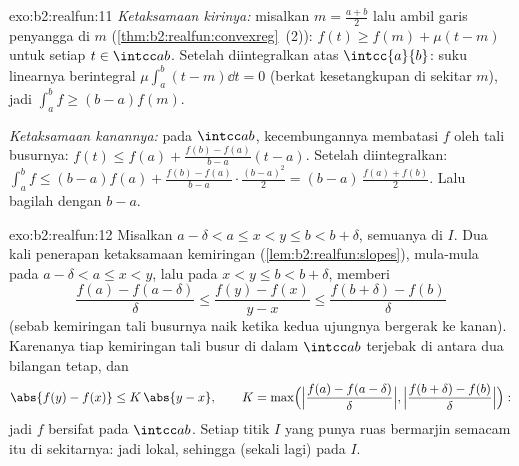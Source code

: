\begin{solution}{exo:b2:realfun:11}
\emph{Ketaksamaan kirinya:} misalkan $m = \frac{a+b}2$ lalu ambil garis
penyangga di $m$ (\cref{thm:b2:realfun:convexreg}~(2)): $f(t) \geq
f(m) + \mu(t - m)$ untuk setiap $t \in \intcc ab$. Setelah diintegralkan
atas $\intcc{a}{b}$: suku linearnya berintegral $\mu\int_a^b(t -
m)\dd t = 0$ (berkat kesetangkupan di sekitar $m$), jadi $\int_a^b f
\geq (b - a)f(m)$.

\emph{Ketaksamaan kanannya:} pada $\intcc ab$, kecembungannya membatasi
$f$ oleh tali busurnya: $f(t) \leq f(a) + \frac{f(b) - f(a)}{b - a}(t -
a)$. Setelah diintegralkan: $\int_a^b f \leq (b-a)f(a) + \frac{f(b) -
f(a)}{b - a}\cdot\frac{(b-a)^2}2 = (b - a)\,\frac{f(a) + f(b)}2$. Lalu
bagilah dengan $b - a$.
\end{solution}

\begin{solution}{exo:b2:realfun:12}
Misalkan $a - \delta < a \leq x < y \leq b < b + \delta$, semuanya di $I$.
Dua kali penerapan ketaksamaan kemiringan
(\cref{lem:b2:realfun:slopes}), mula-mula pada $a - \delta < a \leq x <
y$, lalu pada $x < y \leq b < b + \delta$, memberi
\[
\frac{f(a) - f(a - \delta)}{\delta}
\leq \frac{f(y) - f(x)}{y - x}
\leq \frac{f(b + \delta) - f(b)}{\delta}
\]
(sebab kemiringan tali busurnya naik ketika kedua ujungnya bergerak ke
kanan). Karenanya tiap kemiringan tali busur di dalam $\intcc ab$
terjebak di antara dua bilangan tetap, dan
\[
\abs{f(y) - f(x)} \leq K\,\abs{y - x},
\qquad
K = \max\Bigl(\Bigl|\frac{f(a) - f(a-\delta)}{\delta}\Bigr|,
\Bigl|\frac{f(b+\delta) - f(b)}{\delta}\Bigr|\Bigr):
\]
jadi $f$ bersifat  pada $\intcc ab$. Setiap titik $I$ yang
 punya ruas bermarjin semacam itu di sekitarnya: jadi 
lokal, sehingga (sekali lagi)  pada $I$.
\end{solution}

